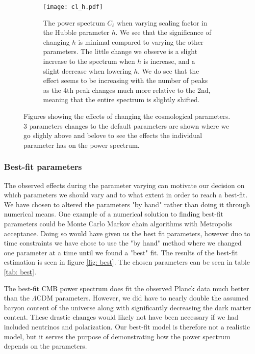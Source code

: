 \documentclass[a4paper, 10pt, reqno]{amsart}
\begin{document}
\begin{figure}
{\begin{subfigure}[t]{0.7\textwidth}
    \label{fig: 1c} 
  \end{subfigure}%
  \begin{subfigure}[t]{0.7\textwidth}
    \centering
    \texttt{[image: cl\_h.pdf]} 
    \caption{The power spectrum $C_\ell$ when varying scaling factor in the Hubble parameter $h$. We see that the significance of changing $h$ is minimal compared to varying the other parameters. The little change we observe is a slight increase to the spectrum when $h$ is increase, and a slight decrease when lowering $h$. We do see that the effect seems to be increasing with the number of peaks as the 4th peak changes much more relative to the 2nd, meaning that the entire spectrum is slightly shifted.} 
    \label{fig: 1d} 
  \end{subfigure} 
  }
  \caption{Figures showing the effects of changing the cosmological parameters. 3 parameters changes to the default parameters are shown where we go slighly above and belove to see the effects the individual parameter has on the power spectrum.}
  \label{fig: vary} 
\end{figure}

\subsubsection{Best-fit parameters}
The observed effects during the parameter varying can motivate our decision on which parameters we should vary and to what extent in order to reach a best-fit. We have chosen to altered the parameters "by hand" rather than doing it through numerical means. One example of a numerical solution to finding best-fit parameters could be Monte Carlo Markov chain algorithms with Metropolis acceptance. Doing so would have given us the best fit parameters, however duo to time constraints we have chose to use the "by hand" method where we changed one parameter at a time until we found a "best" fit. The results of the best-fit estimation is seen in figure \ref{fig: best}. The chosen parameters can be seen in table \ref{tab: best}. 

The best-fit CMB power spectrum does fit the observed Planck data much better than the $\Lambda$CDM parameters. However, we did have to nearly double the assumed baryon content of the universe along with significantly decreasing the dark matter content. These drastic changes would likely not have been necessary if we had included neutrinos and polarization. Our best-fit model is therefore not a realistic model, but it serves the purpose of demonstrating how the power spectrum depends on the parameters. 
\end{document}
